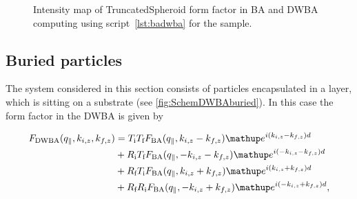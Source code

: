 \begin{figure}[tb]
\hfill
{}
\hfill
{}
\hfill
\caption{Intensity map of TruncatedSpheroid form factor in BA and DWBA computing using script~\ref{lst:badwba} for the sample.}
\label{fig:spheroidbadwba}
\end{figure}

\FloatBarrier


\subsection{Buried particles}

The system considered in this section consists of particles encapsulated in a layer, which is sitting on a substrate (see \cref{fig:SchemDWBAburied}). In this case the form factor in the DWBA is given by

\begin{align}
  F_{\rm{DWBA}}(q_{\plll}, k_{i,z}, k_{f,z})
  &= T_\text{i} T_\text{f} F_{\rm{BA}}(q_{\plll}, k_{i,z}-k_{f,z})\e^{i(k_{i,z}-k_{f,z})d}\nonumber \\
  &+ R_\text{i} T_\text{f} F_{\rm{BA}}(q_{\plll}, -k_{i,z}-k_{f,z})\e^{i(-k_{i,z}-k_{f,z})d} \nonumber \\
  &+ R_\text{f} T_\text{i} F_{\rm{BA}}(q_{\plll}, k_{i,z}+k_{f,z}) \e^{i(k_{i,z}+k_{f,z})d}\nonumber \\
  &+ R_\text{f} R_\text{i}F_{\rm{BA}}(q_{\plll},-k_{i,z}+k_{f,z})\e^{i(-k_{i,z}+k_{f,z})d}, \label{Edwbaburied}
\end{align}

